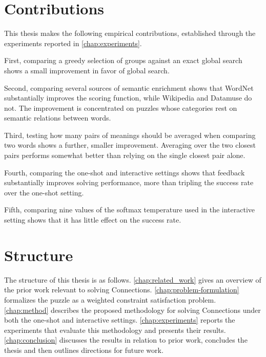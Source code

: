 \section{Contributions}

This thesis makes the following empirical contributions, established through the experiments reported in \autoref{chap:experiments}.

First, comparing a greedy selection of groups against an exact global search shows a small improvement in favor of global search.

Second, comparing several sources of semantic enrichment shows that WordNet substantially improves the scoring function, while Wikipedia and Datamuse do not. The improvement is concentrated on puzzles whose categories rest on semantic relations between words.

Third, testing how many pairs of meanings should be averaged when comparing two words shows a further, smaller improvement. Averaging over the two closest pairs performs somewhat better than relying on the single closest pair alone.

Fourth, comparing the one-shot and interactive settings shows that feedback substantially improves solving performance, more than tripling the success rate over the one-shot setting.

Fifth, comparing nine values of the softmax temperature used in the interactive setting shows that it has little effect on the success rate.

\section{Structure}
The structure of this thesis is as follows.
\autoref{chap:related_work} gives an overview of the prior work relevant to solving Connections. \autoref{chap:problem-formulation} formalizes the puzzle as a weighted constraint satisfaction problem. \autoref{chap:method} describes the proposed methodology for solving Connections under both the one-shot and interactive settings. \autoref{chap:experiments} reports the experiments that evaluate this methodology and presents their results. \autoref{chap:conclusion} discusses the results in relation to prior work, concludes the thesis and then outlines directions for future work.